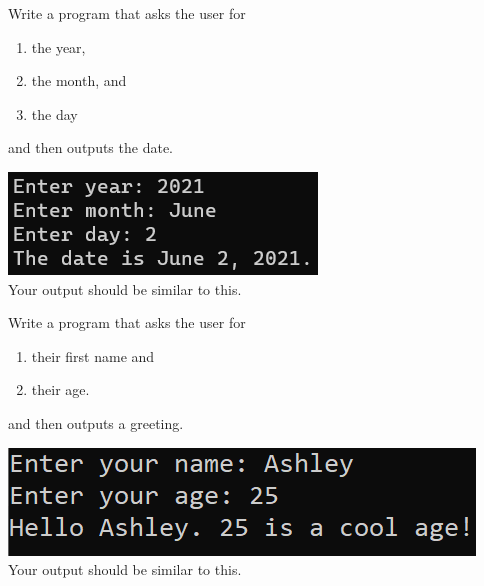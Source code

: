 



	\item Write a program that asks the user for \\
		\begin{minipage}{0.5\textwidth}	
		\vspace*{-0.5em}
			\begin{enumerate}  \setlength\itemsep{-0.3em}
				\item the year,
				\item the month, and
				\item the day	
			\end{enumerate} \vspace*{-1ex}
		and then outputs the date.
		\end{minipage}
		\begin{minipage}{0.5\textwidth}
			\centering
			\includegraphics[scale=0.75]{./imgs/dateOutput.png}\\
			Your output should be similar to this.
		\end{minipage}

	

	\item Write a program that asks the user for \\
		\begin{minipage}{0.5\textwidth}
		\vspace*{-0.5em}
			\begin{enumerate}  \setlength\itemsep{-0.3em}
				\item their first name and
				\item their age.  
			\end{enumerate} \vspace*{-1ex}
		and then outputs a greeting.
		\end{minipage}
		\begin{minipage}{0.5\textwidth}
			\centering
			\includegraphics[scale=0.95]{./imgs/outputGreetingWithAge.png}\\
			Your output should be similar to this.
		\end{minipage}




